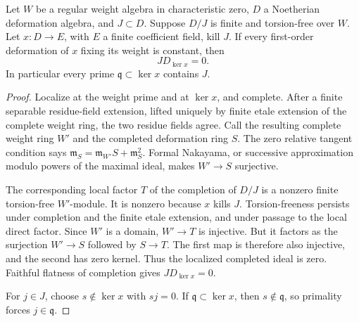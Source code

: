 \begin{srlemma}
\label{lem:sr-faithful-quotient-tangent}
Let \(W\) be a regular weight algebra in characteristic zero,
\(D\) a Noetherian deformation algebra, and \(J\subset D\).
Suppose \(D/J\) is finite and torsion-free over \(W\).
Let \(x:D\to E\), with \(E\) a finite coefficient field,
kill \(J\).
If every first-order deformation of \(x\) fixing its weight
is constant, then
\[
 J D_{\ker x}=0.
\]
In particular every prime \(\mathfrak q\subset\ker x\)
contains \(J\).
\end{srlemma}
\begin{proof}
Localize at the weight prime and at \(\ker x\), and complete.
After a finite separable residue-field extension, lifted
uniquely by finite etale extension of the complete weight
ring, the two residue fields agree.
Call the resulting complete weight ring \(W'\) and the
completed deformation ring \(S\).
The zero relative tangent condition says
\(\mathfrak m_S=\mathfrak m_{W'}S+\mathfrak m_S^2\).
Formal Nakayama, or successive approximation modulo powers of
the maximal ideal, makes \(W'\to S\) surjective.

The corresponding local factor \(T\) of the completion of
\(D/J\) is a nonzero finite torsion-free \(W'\)-module.
It is nonzero because \(x\) kills \(J\).
Torsion-freeness persists under completion and the finite
etale extension, and under passage to the local direct factor.
Since \(W'\) is a domain, \(W'\to T\) is injective.
But it factors as the surjection \(W'\to S\) followed by
\(S\to T\). The first map is therefore also injective, and
the second has zero kernel.
Thus the localized completed ideal is zero.
Faithful flatness of completion gives \(J D_{\ker x}=0\).

For \(j\in J\), choose \(s\notin\ker x\) with \(sj=0\).
If \(\mathfrak q\subset\ker x\), then \(s\notin\mathfrak q\),
so primality forces \(j\in\mathfrak q\).
\end{proof}

